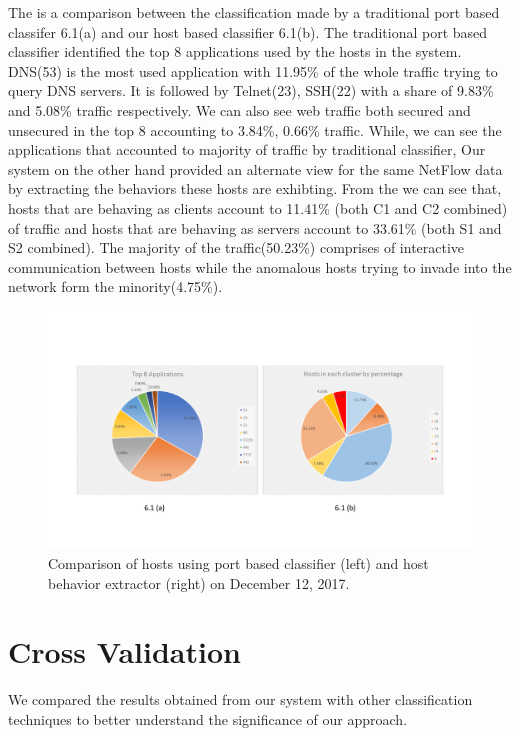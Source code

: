 The  is a comparison between the classification made by a traditional port based classifer 6.1(a) and our host based classifier 6.1(b). The traditional port based classifier identified the top 8 applications used by the hosts in the system. DNS(53) is the most used application with 11.95\% of the whole traffic trying to query DNS servers. It is followed by Telnet(23), SSH(22) with a share of 9.83\% and 5.08\% traffic respectively. We can also see web traffic both secured and unsecured in the top 8 accounting to 3.84\%, 0.66\% traffic. While, we can see the applications that accounted to majority of traffic by traditional classifier, Our system on the other hand provided an alternate view for the same NetFlow data by extracting the behaviors these hosts are exhibting. From the  we can see that, hosts that are behaving as clients account to 11.41\% (both C1 and C2 combined) of traffic and hosts that are behaving as servers account to 33.61\% (both S1 and S2 combined). The majority of the traffic(50.23\%) comprises of interactive communication between hosts while the anomalous hosts trying to invade into the network form the minority(4.75\%). 

\begin{figure}[t]
	\centerline{\includegraphics[trim=2cm 2cm 2cm 2cm, scale = 0.5]{dec12-port-behaviors.pdf}}
	\caption{Comparison of hosts using port based classifier (left) and host behavior extractor (right) on December 12, 2017.}%
\end{figure}


\section{Cross Validation} \label{cross_validation}
We compared the results obtained from our system with other classification techniques to better understand the significance of our approach.

